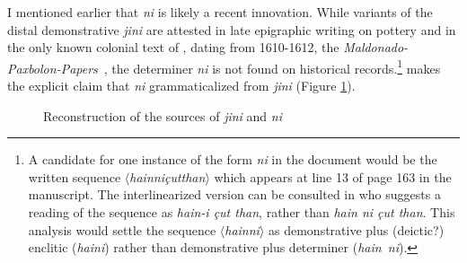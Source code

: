 \documentclass[output=paper
,modfonts
,nonflat]{langsci/langscibook}
\begin{document}
I mentioned earlier that \textit{ni} is likely a recent innovation. While variants of the distal demonstrative \textit{jini} are attested in late epigraphic writing on pottery \citep[][114, 120--121]{Mora-Marin2009} and in the only known colonial text of , dating from 1610-1612, the \textit{Maldonado-Paxbolon-Papers}~\citep{Smailus1975}, the determiner \textit{ni} is not found on historical records.\footnote{A candidate for one instance of the form \textit{ni} in the document would be the written sequence $\langle$\textit{hainniçutthan}$\rangle$ which appears at line 13 of page 163 in the manuscript. The interlinearized version can be consulted in \citet[][71,\,158]{Smailus1975} who suggests a reading of the sequence as \textit{hain-i çut than}, rather than \textit{hain ni çut than}. This analysis would settle the sequence $\langle$\textit{hainni}$\rangle$ as de\-mon\-strative plus (deictic?) enclitic (\textit{haini}) rather than demonstrative plus determiner \mbox{(\textit{hain ni}).}} \citet[][120-121]{Mora-Marin2009} makes the explicit claim that \textit{ni} grammaticalized from \textit{jini} (Figure \ref{tab:diachrony}).

\begin{figure}[h]
	\caption{Reconstruction of the sources of \textit{jini} and \textit{ni}}
	\label{tab:diachrony}
\end{figure}
\end{document}
